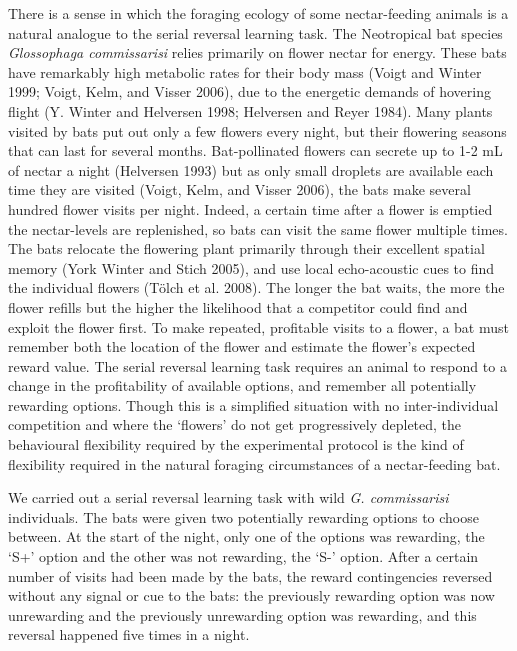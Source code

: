 \documentclass[
]{article}
\begin{document}
There is a sense in which the foraging ecology of some nectar-feeding animals is a natural analogue to the serial reversal learning task. The Neotropical bat species \emph{Glossophaga commissarisi} relies primarily on flower nectar for energy. These bats have remarkably high metabolic rates for their body mass (Voigt and Winter 1999; Voigt, Kelm, and Visser 2006), due to the energetic demands of hovering flight (Y. Winter and Helversen 1998; Helversen and Reyer 1984). Many plants visited by bats put out only a few flowers every night, but their flowering seasons that can last for several months. Bat-pollinated flowers can secrete up to 1-2 mL of nectar a night (Helversen 1993) but as only small droplets are available each time they are visited (Voigt, Kelm, and Visser 2006), the bats make several hundred flower visits per night. Indeed, a certain time after a flower is emptied the nectar-levels are replenished, so bats can visit the same flower multiple times. The bats relocate the flowering plant primarily through their excellent spatial memory (York Winter and Stich 2005), and use local echo-acoustic cues to find the individual flowers (Tölch et al. 2008). The longer the bat waits, the more the flower refills but the higher the likelihood that a competitor could find and exploit the flower first. To make repeated, profitable visits to a flower, a bat must remember both the location of the flower and estimate the flower's expected reward value. The serial reversal learning task requires an animal to respond to a change in the profitability of available options, and remember all potentially rewarding options. Though this is a simplified situation with no inter-individual competition and where the `flowers' do not get progressively depleted, the behavioural flexibility required by the experimental protocol is the kind of flexibility required in the natural foraging circumstances of a nectar-feeding bat.

We carried out a serial reversal learning task with wild \emph{G. commissarisi} individuals. The bats were given two potentially rewarding options to choose between. At the start of the night, only one of the options was rewarding, the `S+' option and the other was not rewarding, the `S-' option. After a certain number of visits had been made by the bats, the reward contingencies reversed without any signal or cue to the bats: the previously rewarding option was now unrewarding and the previously unrewarding option was rewarding, and this reversal happened five times in a night.
\end{document}
